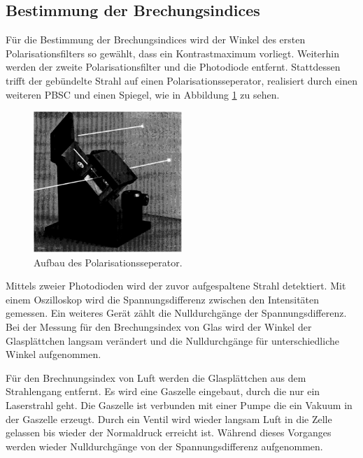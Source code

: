 \subsection{Bestimmung der Brechungsindices}
Für die Bestimmung der Brechungsindices wird der
Winkel des ersten Polarisationsfilters so gewählt, dass ein Kontrastmaximum vorliegt.
Weiterhin werden der zweite Polarisationsfilter und die Photodiode entfernt.
Stattdessen trifft der gebündelte Strahl auf einen Polarisationsseperator, realisiert durch einen
weiteren PBSC und einen Spiegel, wie in Abbildung \ref{fig:polsep} zu sehen.
\begin{figure}
     \centering
     \includegraphics[width=0.5\textwidth]{PSBC.PNG}
     \caption{Aufbau des Polarisationsseperator.\cite{skript}}
     \label{fig:polsep}
\end{figure}
\FloatBarrier
Mittels zweier Photodioden wird der zuvor aufgespaltene Strahl detektiert.
Mit einem Oszilloskop wird die Spannungsdifferenz zwischen den Intensitäten
gemessen. Ein weiteres Gerät zählt die Nulldurchgänge der Spannungsdifferenz.
Bei der Messung für den Brechungsindex von Glas wird
der Winkel der Glasplättchen langsam verändert und die Nulldurchgänge für unterschiedliche
Winkel aufgenommen.

Für den Brechnungsindex von Luft werden die Glasplättchen
aus dem Strahlengang entfernt. Es wird eine Gaszelle eingebaut, durch
die nur ein Laserstrahl geht. Die Gaszelle ist verbunden mit einer Pumpe
die ein Vakuum in der Gaszelle erzeugt. Durch ein Ventil wird wieder langsam
Luft in die Zelle gelassen bis wieder der Normaldruck erreicht ist. Während
dieses Vorganges werden wieder Nulldurchgänge von der Spannungsdifferenz aufgenommen.
